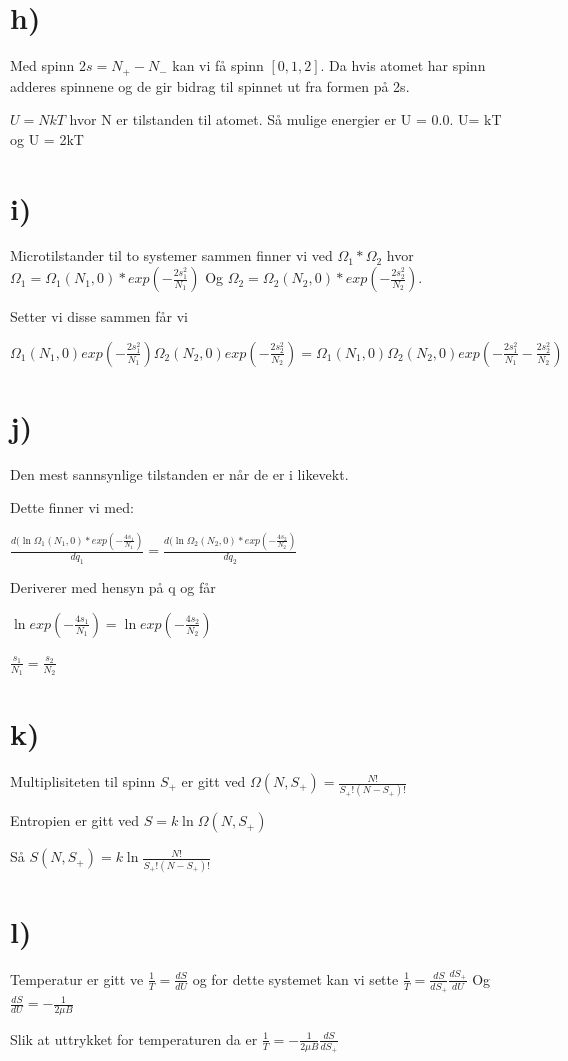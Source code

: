 \documentclass[norsk,12pt]{article}
\begin{document}
\section*{h)}

Med spinn $2s = N_+ - N_-$ kan vi få spinn $[0, 1, 2]$. Da hvis atomet har spinn adderes spinnene og de gir bidrag til spinnet ut fra formen på 2s. 

$U = NkT$ hvor N er tilstanden til atomet. Så mulige energier er U = 0.0. U= kT og U = 2kT
 
 
\section*{i)}

Microtilstander til to systemer sammen finner vi ved $\Omega_1*\Omega_2$ hvor $\Omega_1 = \Omega_1(N_1,0)*exp(-\frac{2s_1^2}{N_1})$ Og $\Omega_2 = \Omega_2(N_2,0)*exp(-\frac{2s_2^2}{N_2})$. 

Setter vi disse sammen får vi

$\Omega_1(N_1,0)exp(-\frac{2s_1^2}{N_1})\Omega_2(N_2,0)exp(-\frac{2s_2^2}{N_2}) = \Omega_1(N_1,0)\Omega_2(N_2,0)exp(-\frac{2s_1^2}{N_1}-\frac{2s_2^2}{N_2})$

 
\section*{j)}

Den mest sannsynlige tilstanden er når de er i likevekt. 

Dette finner vi med: 

$\frac{d(\ln{\Omega_1(N_1,0)*exp(-\frac{4s_1}{N_1})}}{dq_1} = \frac{d(\ln{\Omega_2(N_2,0)*exp(-\frac{4s_2}{N_2})}}{dq_2}$

Deriverer med hensyn på q og får

$\ln{exp(-\frac{4s_1}{N_1})} = \ln{exp(-\frac{4s_2}{N_2})}$

$\frac{s_1}{N_1} = \frac{s_2}{N_2}$ 


\section*{k)}

Multiplisiteten til spinn $S_+$ er gitt ved $\Omega (N,S_+) = \frac{N!}{S_+!(N-S_+)!}$

Entropien er gitt ved $S = k \ln{\Omega (N,S_+)}$

Så $S(N,S_+) = k \ln{\frac{N!}{S_+!(N-S_+)!}}$

\section*{l)}

Temperatur er gitt ve $\frac{1}{T} = \frac{dS}{dU}$ og for dette systemet kan vi sette $\frac{1}{T} = \frac{dS}{dS_+}\frac{dS_+}{dU}$ Og $\frac{dS}{dU} = -\frac{1}{2\mu B}$

Slik at uttrykket for temperaturen da er $\frac{1}{T} = -\frac{1}{2\mu B}\frac{dS}{dS_+}$
\end{document}
